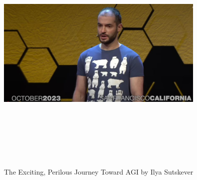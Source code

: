 \documentclass[a4paper,12pt]{article}
\begin{document}
\vspace{50pt} %
\begin{figure}[h]
	\centering
	\vspace{-10pt} %
	\includegraphics[width=0.9\textwidth, height=12cm, keepaspectratio]{../Talks Blogs/The Exciting, Perilous Journey Toward AGI - Ilya Sutskever - TED}
	\vspace{-5pt} %
	\caption{The Exciting, Perilous Journey Toward AGI by Ilya Sutskever}
	\vspace{-10pt}
\end{figure}
\end{document}
